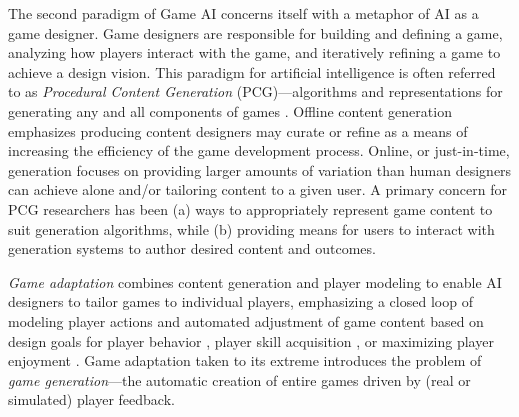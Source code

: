 \documentclass[conference]{IEEEtran}
\begin{document}
%
The second paradigm of Game AI concerns itself with a metaphor of AI as a game designer. 
Game designers are responsible for building and defining a game, analyzing how players interact with the game, and iteratively refining a game to achieve a design vision. 
%
This paradigm for artificial intelligence is often referred to as {\em Procedural Content Generation} (PCG)---algorithms and representations for generating any and all components of games \cite{hendrikx2013:pcg, togelius2011:sbpcg, yannakakis2012:gameai-revisited}.
% 
%
Offline content generation emphasizes producing content designers may curate or refine as a means of increasing the efficiency of the game development process.
Online, or just-in-time, generation focuses on providing larger amounts of variation than human designers can achieve alone and/or tailoring content to a given user.
A primary concern for PCG researchers has been (a) ways to appropriately represent game content to suit generation algorithms, while (b) providing means for users to interact with generation systems to author desired content and outcomes.

{\em Game adaptation} combines content generation and player modeling to enable AI designers to tailor games to individual players, emphasizing a closed loop of modeling player actions and automated adjustment of game content based on design goals for player behavior \cite{smith2012:refraction}, player skill acquisition \cite{andersen2013:trace}, or maximizing player enjoyment \cite{yu2012:prefix-based, thue2007:storytell-pm, shaker2010:platformer-gen}.
%
Game adaptation taken to its extreme introduces the problem of {\em game generation}---the automatic creation of entire games driven by (real or simulated) player feedback.
\end{document}
